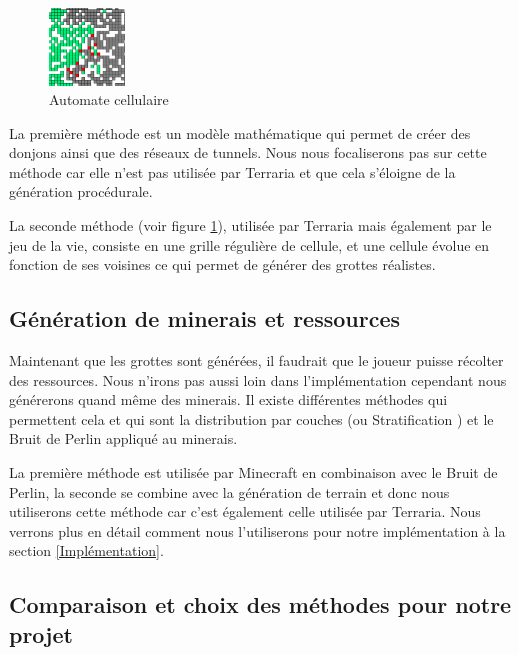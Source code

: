\documentclass[12pt]{article}
\begin{document}
\begin{figure}
  \centering
  \includegraphics[width=0.18\textwidth]{assets/automate_cellulaire.png}
  \caption{Automate cellulaire}
  \label{automate_cellulaire}
  \vspace{0.5cm}
\end{figure}



La première méthode est un modèle mathématique qui permet de créer des donjons ainsi que des réseaux de tunnels. Nous nous focaliserons pas sur cette méthode car elle n'est pas utilisée par Terraria et que cela s'éloigne de la génération procédurale.\par 
La seconde méthode (voir figure \ref{automate_cellulaire}), utilisée par Terraria mais également par le jeu de la vie, consiste en une grille régulière de cellule, et une cellule évolue en fonction de ses voisines ce qui permet de générer des grottes réalistes.
\par
\vspace{2.5cm}
\subsection{Génération de minerais et ressources}
Maintenant que les grottes sont générées, il faudrait que le joueur puisse récolter des ressources. Nous n'irons pas aussi loin dans l'implémentation cependant nous générerons quand même des minerais. Il existe différentes méthodes qui permettent cela et qui sont la distribution par couches (ou Stratification \cite{stratification}) et le Bruit de Perlin appliqué au minerais. \par
La première méthode est utilisée par Minecraft en combinaison avec le Bruit de Perlin, la seconde se combine avec la génération de terrain et donc nous utiliserons cette méthode car c'est également celle utilisée par Terraria. Nous verrons plus en détail comment nous l'utiliserons pour notre implémentation à la section \ref{Implémentation}.
\vspace{1cm}
\subsection{Comparaison et choix des méthodes pour notre projet}
\end{document}
